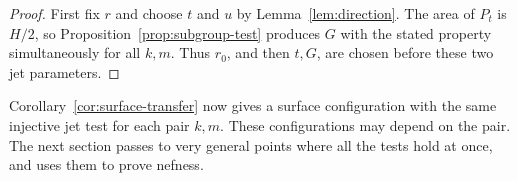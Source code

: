 \begin{proof}
First fix $r$ and choose $t$ and $u$ by Lemma~\ref{lem:direction}.
The area of $P_t$ is $H/2$, so Proposition~\ref{prop:subgroup-test}
produces $G$ with the stated property simultaneously for all $k,m$.
Thus $r_0$, and then $t,G$, are chosen before these two jet parameters.
\end{proof}

Corollary~\ref{cor:surface-transfer} now gives a surface configuration
with the same injective jet test for each pair $k,m$.  These configurations
may depend on the pair.  The next section passes to very general points
where all the tests hold at once, and uses them to prove nefness.
